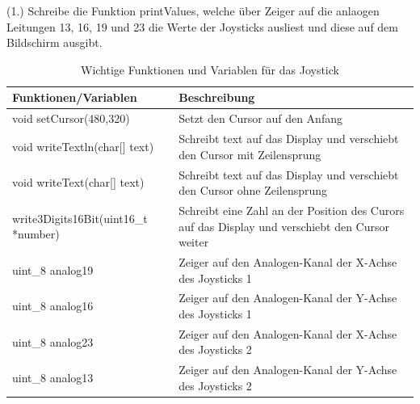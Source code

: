 (1.) Schreibe die Funktion printValues, welche über Zeiger auf die anlaogen Leitungen 13, 16, 19 und 23 die Werte der Joysticks ausliest und diese auf dem Bildschirm ausgibt. 

\begin{table}[]
	\centering
	\caption{Wichtige Funktionen und Variablen für das Joystick}
	\label{joystickInfo}
	\begin{tabular}{|l|l|}
	\hline
	\textbf{Funktionen/Variablen} & \textbf{Beschreibung} \\ \hline
	void setCursor(480,320) & Setzt den Cursor auf den Anfang \\ \hline
	void writeTextln(char{[}{]} text) & Schreibt text auf das Display und verschiebt den Cursor mit Zeilensprung \\ \hline
	void writeText(char{[}{]} text) & Schreibt text auf das Display und verschiebt den Cursor ohne Zeilensprung \\ \hline
	write3Digits16Bit(uint16\_t *number) & Schreibt eine Zahl an der Position des Curors auf das Display und verschiebt den Cursor weiter \\ \hline
	uint\_8 analog19 & Zeiger auf den Analogen-Kanal der X-Achse des Joysticks 1 \\ \hline
	uint\_8 analog16 & Zeiger auf den Analogen-Kanal der Y-Achse des Joysticks 1 \\ \hline
	uint\_8 analog23 & Zeiger auf den Analogen-Kanal der X-Achse des Joysticks 2 \\ \hline
	uint\_8 analog13 & Zeiger auf den Analogen-Kanal der Y-Achse des Joysticks 2 \\ \hline
	\end{tabular}
\end{table}
